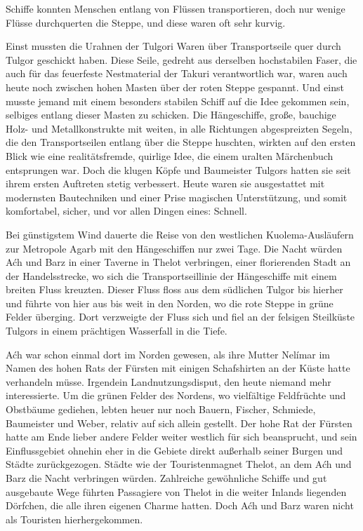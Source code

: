 Schiffe konnten Menschen entlang von Flüssen transportieren, doch nur wenige Flüsse durchquerten die Steppe, und diese waren oft sehr kurvig.

Einst mussten die Urahnen der Tulgori Waren über Transportseile quer durch Tulgor geschickt haben. Diese Seile, gedreht aus derselben hochstabilen Faser, die auch für das feuerfeste Nestmaterial der Takuri verantwortlich war, waren auch heute noch zwischen hohen Masten über der roten Steppe gespannt. Und einst musste jemand mit einem besonders stabilen Schiff auf die Idee gekommen sein, selbiges entlang dieser Masten zu schicken. Die Hängeschiffe, große, bauchige Holz- und Metallkonstrukte mit weiten, in alle Richtungen abgespreizten Segeln, die den Transportseilen entlang über die Steppe huschten, wirkten auf den ersten Blick wie eine realitätsfremde, quirlige Idee, die einem uralten Märchenbuch entsprungen war. Doch die klugen Köpfe und Baumeister Tulgors hatten sie seit ihrem ersten Auftreten stetig verbessert. Heute waren sie ausgestattet mit modernsten Bautechniken und einer Prise magischen Unterstützung, und somit komfortabel, sicher, und vor allen Dingen eines: Schnell.

Bei günstigstem Wind dauerte die Reise von den westlichen Kuolema-Ausläufern zur Metropole Agarb mit den Hängeschiffen nur zwei Tage. Die Nacht würden Aćh und Barz in einer Taverne in Thelot verbringen, einer florierenden Stadt an der Handelsstrecke, wo sich die Transportseillinie der Hängeschiffe mit einem breiten Fluss kreuzten. Dieser Fluss floss aus dem südlichen Tulgor bis hierher und führte von hier aus bis weit in den Norden, wo die rote Steppe in grüne Felder überging. Dort verzweigte der Fluss sich und fiel an der felsigen Steilküste Tulgors in einem prächtigen Wasserfall in die Tiefe.

Aćh war schon einmal dort im Norden gewesen, als ihre Mutter Nelímar im Namen des hohen Rats der Fürsten mit einigen Schafshirten an der Küste hatte verhandeln müsse. Irgendein Landnutzungsdisput, den heute niemand mehr interessierte. Um die grünen Felder des Nordens, wo vielfältige Feldfrüchte und Obstbäume gediehen, lebten heuer nur noch Bauern, Fischer, Schmiede, Baumeister und Weber, relativ auf sich allein gestellt. Der hohe Rat der Fürsten hatte am Ende lieber andere Felder weiter westlich für sich beansprucht, und sein Einflussgebiet ohnehin eher in die Gebiete direkt außerhalb seiner Burgen und Städte zurückgezogen. Städte wie der Touristenmagnet Thelot, an dem Aćh und Barz die Nacht verbringen würden. Zahlreiche gewöhnliche Schiffe und gut ausgebaute Wege führten Passagiere von Thelot in die weiter Inlands liegenden Dörfchen, die alle ihren eigenen Charme hatten. Doch Aćh und Barz waren nicht als Touristen hierhergekommen.



